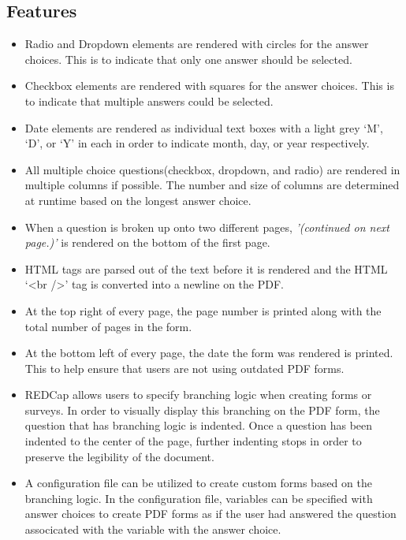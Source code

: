\documentclass[12pt]{article}
\begin{document}
    \subsection{Features}
        \begin{itemize}
            \itemsep0pt
		\item Radio and Dropdown elements are rendered with circles for the answer choices. This is to indicate that only one answer should be selected.
		\item Checkbox elements are rendered with squares for the answer choices. This is to indicate that multiple answers could be selected.
		\item Date elements are rendered as individual text boxes with a light grey `M', `D', or `Y' in each in order to indicate month, day, or year respectively.
	        \item All multiple choice questions(checkbox, dropdown, and radio) are rendered in multiple columns if possible. The number and size of columns are determined at runtime based on the longest answer choice. 
		\item When a question is broken up onto two different pages, \textit{'(continued on next page.)'} is rendered on the bottom of the first page.
		\item HTML tags are parsed out of the text before it is rendered and the HTML `\textless br /\textgreater' tag is converted into a newline on the PDF.
		\item At the top right of every page, the page number is printed along with the total number of pages in the form.
		\item At the bottom left of every page, the date the form was rendered is printed. This to help ensure that users are not using outdated PDF forms.
		\item REDCap allows users to specify branching logic when creating forms or surveys. In order to visually display this branching on the PDF form, the question that has branching logic is indented. Once a question has been indented to the center of the page, further indenting stops in order to preserve the legibility of the document.
		\item A configuration file can be utilized to create custom forms based on the branching logic. In the configuration file, variables can be specified with answer choices to create PDF forms as if the user had answered the question associcated with the variable with the answer choice.
	    \end{itemize}
\end{document}
